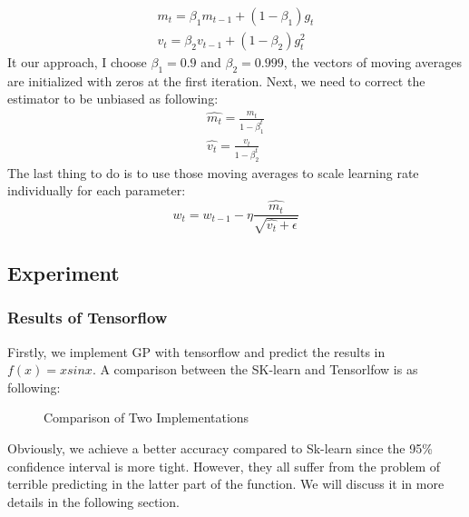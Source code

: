 \documentclass{article}
\begin{document}
\begin{equation}
\begin{split}
m_t=\beta_1m_{t-1}+(1-\beta_1)g_t    \\
v_t=\beta_2v_{t-1}+(1-\beta_2)g_t^2
\end{split}
\end{equation}
It our approach, I choose $\beta_1=0.9$ and $\beta_2=0.999$, the vectors of moving averages are initialized with zeros at the first iteration. Next, we need to correct the estimator to be unbiased as following:
\begin{equation} \label{eqn2}
\begin{split}
\hat{m_t}=\frac{m_t}{1-\beta_1^t}    \\
\hat{v_t}=\frac{v_t}{1-\beta_2^t}
\end{split}
\end{equation}
The last thing to do is to use those moving averages to scale learning rate individually for each parameter:
\begin{equation}
w_t=w_{t-1}-\eta\frac{\hat{m_t}}{\sqrt{\hat{v_t}+\epsilon}}
\end{equation}

\subsection{Experiment}
\subsubsection{Results of Tensorflow}
Firstly, we implement GP with tensorflow and predict the results in $f(x)=xsinx$. A comparison between the SK-learn and Tensorlfow is as following:
\begin{figure}[H]
	\centering
	\caption{Comparison of Two Implementations}
	\label{fig1}
\end{figure}
Obviously, we achieve a better accuracy compared to Sk-learn since the 95\% confidence interval is more tight. However, they all suffer from the problem of terrible predicting in the latter part of the function. We will discuss it in more details in the following section.
\end{document}

